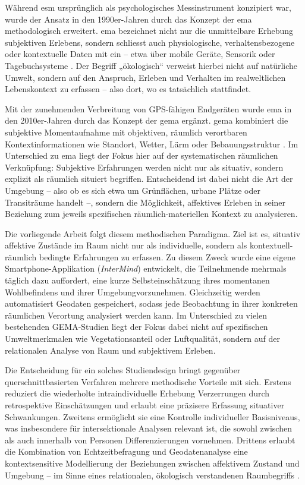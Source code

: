 Während \acrshort{esm} ursprünglich als psychologisches Messinstrument konzipiert war, wurde der Ansatz in den 1990er-Jahren durch das Konzept der \acrfull{ema} methodologisch erweitert. \acrshort{ema} bezeichnet nicht nur die unmittelbare Erhebung subjektiven Erlebens, sondern schliesst auch physiologische, verhaltensbezogene oder kontextuelle Daten mit ein – etwa über mobile Geräte, Sensorik oder Tagebuchsysteme \parencite{shiffmanEcologicalMomentaryAssessment2008}. Der Begriff „ökologisch“ verweist hierbei nicht auf natürliche Umwelt, sondern auf den Anspruch, Erleben und Verhalten im realweltlichen Lebenskontext zu erfassen – also dort, wo es tatsächlich stattfindet.

Mit der zunehmenden Verbreitung von GPS-fähigen Endgeräten wurde \acrshort{ema} in den 2010er-Jahren durch das Konzept der \acrfull{gema} ergänzt. \acrshort{gema} kombiniert die subjektive Momentaufnahme mit objektiven, räumlich verortbaren Kontextinformationen wie Standort, Wetter, Lärm oder Bebauungsstruktur \parencite{kirchnerSpatiotemporalDeterminantsMental2016}. Im Unterschied zu \acrshort{ema} liegt der Fokus hier auf der systematischen räumlichen Verknüpfung: Subjektive Erfahrungen werden nicht nur als situativ, sondern explizit als räumlich situiert begriffen. Entscheidend ist dabei nicht die Art der Umgebung – also ob es sich etwa um Grünflächen, urbane Plätze oder Transiträume handelt –, sondern die Möglichkeit, affektives Erleben in seiner Beziehung zum jeweils spezifischen räumlich-materiellen Kontext zu analysieren.

Die vorliegende Arbeit folgt diesem methodischen Paradigma. Ziel ist es, situativ affektive Zustände im Raum nicht nur als individuelle, sondern als kontextuell-räumlich bedingte Erfahrungen zu erfassen. Zu diesem Zweck wurde eine eigene Smartphone-Applikation (\textit{InterMind}) entwickelt, die Teilnehmende mehrmals täglich dazu auffordert, eine kurze Selbsteinschätzung ihres momentanen Wohlbefindens und ihrer Umgebungvorzunehmen. Gleichzeitig werden automatisiert Geodaten gespeichert, sodass jede Beobachtung in ihrer konkreten räumlichen Verortung analysiert werden kann. Im Unterschied zu vielen bestehenden GEMA-Studien liegt der Fokus dabei nicht auf spezifischen Umweltmerkmalen wie Vegetationsanteil oder Luftqualität, sondern auf der relationalen Analyse von Raum und subjektivem Erleben.

Die Entscheidung für ein solches Studiendesign bringt gegenüber querschnittbasierten Verfahren mehrere methodische Vorteile mit sich. Erstens reduziert die wiederholte intraindividuelle Erhebung Verzerrungen durch retrospektive Einschätzungen und erlaubt eine präzisere Erfassung situativer Schwankungen. Zweitens ermöglicht sie eine Kontrolle individueller Basisniveaus, was insbesondere für intersektionale Analysen relevant ist, die sowohl zwischen als auch innerhalb von Personen Differenzierungen vornehmen. Drittens erlaubt die Kombination von Echtzeitbefragung und Geodatenanalyse eine kontextsensitive Modellierung der Beziehungen zwischen affektivem Zustand und Umgebung – im Sinne eines relationalen, ökologisch verstandenen Raumbegriffs \parencite{mascherekMeadowsAsphaltRoad2025}.

